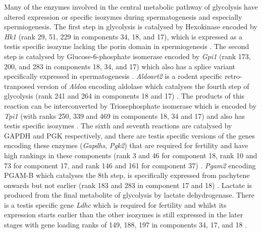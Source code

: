 Many of the enzymes involved in the central metabolic pathway of glycolysis have altered expression or specific isozymes during spermatogenesis and especially spermiogenesis. The first step in glycolysis is catalysed by Hexokinase encoded by \textit{Hk1} (rank 29, 51, 229 in components 34, 18, and 17), which is expressed as a testis specific isozyme lacking the porin domain in spermiogenesis \parencite{Mori1993Unique,Nakamura2008Spermatogenic}. The second step is catalysed by Glucose-6-phosphate isomerase encoded by \textit{Gpi1} (rank 173, 200, and 283 in components 18, 34, and 17) which also has a splice variant specifically expressed in spermatogenesis \parencite{Buehr1981electrophoretically, Vemuganti2010Frequent}. \textit{Aldoart2} is a rodent specific retro-tranposed version of \textit{Aldoa} encoding aldolase which catalyses the fourth step of glycolysis (rank 241 and 264 in components 18 and 17) \parencite{Vemuganti2007Three, Vemuganti2010Frequent}. The products of this reaction can be interconverted by Triosephosphate isomerase which is encoded by \textit{Tpi1} (with ranks 250, 339 and 469 in components 18, 34 and 17) and also has testis specific isozymes \parencite{Ijiri2013Male}. The sixth and seventh reactions are catalysed by GAPDH and PGK respectively, and there are testis specific versions of the genes encoding these enzymes (\textit{Gapdhs}, \textit{Pgk2}) that are required for fertility and have high rankings in these components (rank 3 and 46 for component 18, rank 10 and 73 for component 17, and rank 146 and 161 for component 37) \parencite{McCarrey1987Human,Welch1992Expression, Miki2004Glyceraldehyde, Danshina2010Phosphoglycerate}. \textit{Pgam2} encoding PGAM-B which catalyses the 8th step, is specifically expressed from pachytene onwards but not earlier (rank 183 and 283 in component 17 and 18) \parencite{Fundele1987Developmental}. Lactate is produced from the final metabolite of glycolysis by lactate dehydrogenase. There is a testis specific gene \textit{Ldhc} which is required for fertility and whilst its expression starts earlier than the other isozymes is still expressed in the later stages with gene loading ranks of 149, 188, 197 in components 34, 17, and 18 \parencite{Sakai1987Molecular, Odet2008Expression}.


